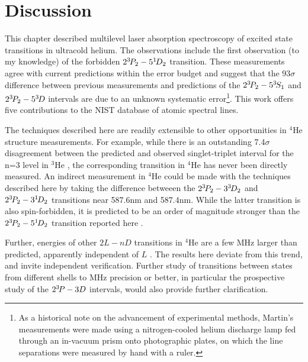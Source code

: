 \section{Discussion}


	This chapter described multilevel laser absorption spectroscopy of excited state transitions in ultracold helium.
	The observations include the first observation (to my knowledge) of the forbidden $2^{3\!} P_2 - 5^{1\!} D_2$ transition.
	These measurements agree with current predictions within the error budget and suggest that the $93\sigma$ difference between previous measurements \cite{Martin60} and predictions \cite{Morton06} of the $2^{3\!}P_2  -  5^{3\!}S_{1}$ and $2^{3\!}P_2  -  5^{3\!}D$ intervals are due to an unknown systematic error\footnote{As a historical note on the advancement of experimental methods, Martin's measurements were made using a nitrogen-cooled helium discharge lamp fed through an in-vacuum prism onto photographic plates, on which the line separations were measured by hand with a ruler.}.
	This work offers five contributions to the NIST database of atomic spectral lines.

	The techniques described here are readily extensible to other opportunities in $^4$He structure measurements.
	For example, while there is an outstanding 7.4$\sigma$ disagreement between the predicted and observed singlet-triplet interval for the n=3 level in $^3$He \cite{Morton06,Derouard80}, the corresponding transition in $^4$He has never been directly measured.
	An indirect measurement in $^4$He could be made with the techniques described here by taking the difference betweeen the $2^{3\!} P_2 - 3^{3\!} D_2$ and $2^{3\!} P_2 - 3^{1\!} D_2$ transitions near 587.6nm and 587.4nm.
	While the latter transition is also spin-forbidden, it is predicted to be an order of magnitude stronger than the $2^{3\!} P_2 - 5^{1\!} D_2$ transition reported here \cite{Morton06}.

	{Further, energies of other $2L-nD$ transitions in $^4$He are a few MHz larger than predicted, apparently independent of $L$ \cite{Wienczek19,Yerokhin20}.
	The results here deviate from this trend, and invite independent verification.
	Further study of transitions between states from different shells to MHz precision or better, in particular the prospective study of the $2^{3\!} P - 3 D$ intervals, would also provide further clarification.}

